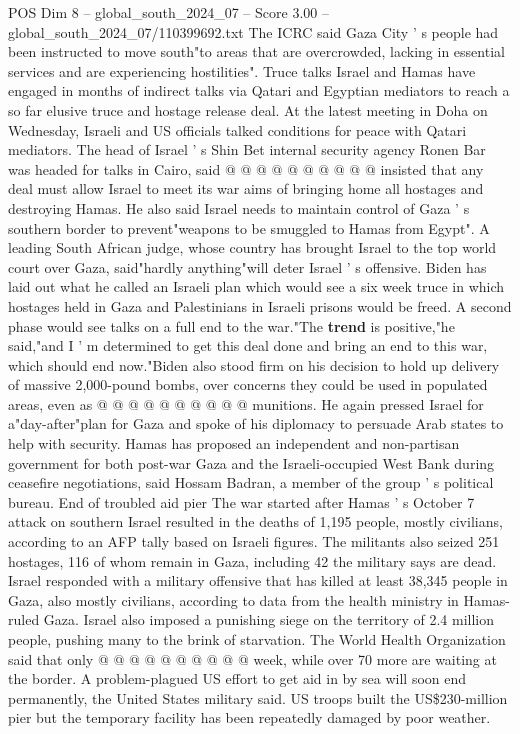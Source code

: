 \begin{textsample}{POS Dim 8 – global\_south\_2024\_07 – Score 3.00 – global\_south\_2024\_07/110399692.txt}
The ICRC said Gaza City ' s people had been instructed to move south"to areas that are overcrowded, lacking in essential services and are experiencing hostilities".
Truce talks Israel and Hamas have engaged in months of indirect talks via Qatari and Egyptian mediators to reach a so far elusive truce and hostage release deal.
At the latest meeting in Doha on Wednesday, Israeli and US officials talked conditions for peace with Qatari mediators.
The head of Israel ' s Shin Bet internal security agency Ronen Bar was headed for talks in Cairo, said @ @ @ @ @ @ @ @ @ @ insisted that any deal must allow Israel to meet its war aims of bringing home all hostages and destroying Hamas.
He also said Israel needs to maintain control of Gaza ' s southern border to prevent"weapons to be smuggled to Hamas from Egypt".
A leading South African judge, whose country has brought Israel to the top world court over Gaza, said"hardly anything"will deter Israel ' s offensive.
Biden has laid out what he called an Israeli plan which would see a six week truce in which hostages held in Gaza and Palestinians in Israeli prisons would be freed.
A second phase would see talks on a full end to the war."The \textbf{trend} is positive,"he said,"and I ' m determined to get this deal done and bring an end to this war, which should end now."Biden also stood firm on his decision to hold up delivery of massive 2,000-pound bombs, over concerns they could be used in populated areas, even as @ @ @ @ @ @ @ @ @ @ munitions.
He again pressed Israel for a"day-after"plan for Gaza and spoke of his diplomacy to persuade Arab states to help with security.
Hamas has proposed an independent and non-partisan government for both post-war Gaza and the Israeli-occupied West Bank during ceasefire negotiations, said Hossam Badran, a member of the group ' s political bureau.
End of troubled aid pier The war started after Hamas ' s October 7 attack on southern Israel resulted in the deaths of 1,195 people, mostly civilians, according to an AFP tally based on Israeli figures.
The militants also seized 251 hostages, 116 of whom remain in Gaza, including 42 the military says are dead.
Israel responded with a military offensive that has killed at least 38,345 people in Gaza, also mostly civilians, according to data from the health ministry in Hamas-ruled Gaza.
Israel also imposed a punishing siege on the territory of 2.4 million people, pushing many to the brink of starvation.
The World Health Organization said that only @ @ @ @ @ @ @ @ @ @ week, while over 70 more are waiting at the border.
A problem-plagued US effort to get aid in by sea will soon end permanently, the United States military said.
US troops built the US\$230-million pier but the temporary facility has been repeatedly damaged by poor weather.

\end{textsample}
